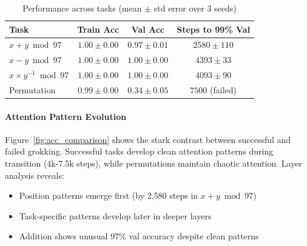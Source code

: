 \documentclass{article} %
\begin{document}
\begin{table}[h]
\centering
\caption{Performance across tasks (mean $\pm$ std error over 3 seeds)}
\begin{tabular}{lccc}
\toprule
Task & Train Acc & Val Acc & Steps to 99\% Val \\
\midrule
$x + y \bmod 97$ & $1.00 \pm 0.00$ & $0.97 \pm 0.01$ & $2580 \pm 110$ \\
$x - y \bmod 97$ & $1.00 \pm 0.00$ & $1.00 \pm 0.00$ & $4393 \pm 33$ \\
$x \times y^{-1} \bmod 97$ & $1.00 \pm 0.00$ & $1.00 \pm 0.00$ & $4093 \pm 90$ \\
Permutation & $0.99 \pm 0.00$ & $0.34 \pm 0.05$ & $7500$ (failed) \\
\bottomrule
\end{tabular}
\label{tab:results}
\end{table}

\paragraph{Attention Pattern Evolution} Figure~\ref{fig:acc_comparison} shows the stark contrast between successful and failed grokking. Successful tasks develop clean attention patterns during transition (4k-7.5k steps), while permutations maintain chaotic attention. Layer analysis reveals:
\begin{itemize}
    \item Position patterns emerge first (by 2,580 steps in $x+y \bmod 97$)
    \item Task-specific patterns develop later in deeper layers
    \item Addition shows unusual 97\% val accuracy despite clean patterns
\end{itemize}
\end{document}
